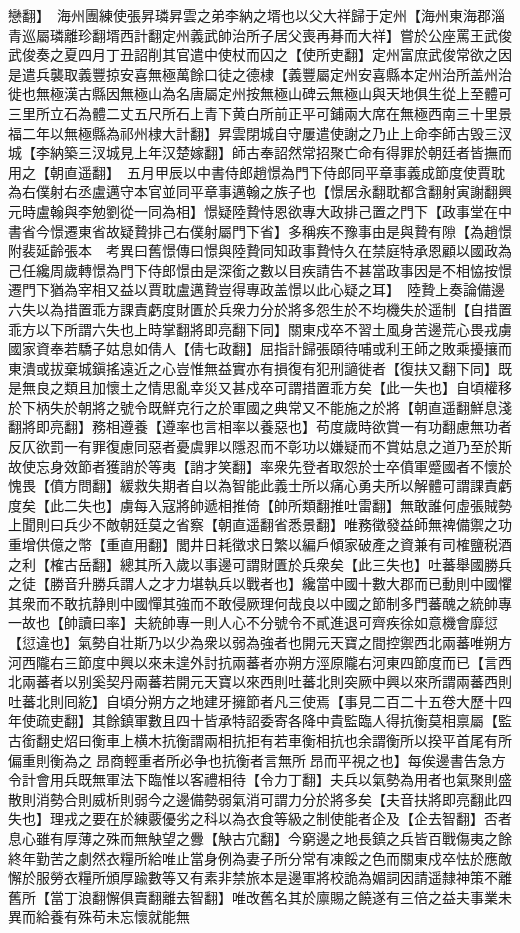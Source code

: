 戀翻】　海州團練使張昇璘昇雲之弟李納之壻也以父大祥歸于定州【海州東海郡淄青巡屬璘離珍翻壻西計翻定州義武帥治所子居父喪再朞而大祥】嘗於公座罵王武俊武俊奏之夏四月丁丑詔削其官遣中使杖而囚之【使所吏翻】定州富庶武俊常欲之因是遣兵襲取義豐掠安喜無極萬餘口徒之德棣【義豐屬定州安喜縣本定州治所盖州治徙也無極漢古縣因無極山為名唐屬定州按無極山碑云無極山與天地俱生從上至體可三里所立石為體二丈五尺所石上青下黄白所前正平可鋪兩大席在無極西南三十里景福二年以無極縣為祁州棣大計翻】昇雲閉城自守屢遣使謝之乃止上命李師古毁三汊城【李納築三汊城見上年汉楚嫁翻】師古奉詔然常招聚亡命有得罪於朝廷者皆撫而用之【朝直遥翻】　五月甲辰以中書侍郎趙憬為門下侍郎同平章事義成節度使賈耽為右僕射右丞盧邁守本官並同平章事邁翰之族子也【憬居永翻耽都含翻射寅謝翻興元時盧翰與李勉劉從一同為相】憬疑陸贄恃恩欲專大政排己置之門下【政事堂在中書省今憬遷東省故疑贄排己右僕射屬門下省】多稱疾不豫事由是與贄有隙【為趙憬附裴延齡張本　考異曰舊憬傳曰憬與陸贄同知政事贄恃久在禁庭特承恩顧以國政為己任纔周歲轉憬為門下侍郎憬由是深銜之數以目疾請告不甚當政事因是不相恊按憬遷門下猶為宰相又益以賈耽盧邁贄豈得專政盖憬以此心疑之耳】　陸贄上奏論備邊六失以為措置乖方課責虧度財匱於兵衆力分於將多怨生於不均機失於遥制【自措置乖方以下所謂六失也上時掌翻將即亮翻下同】關東戍卒不習土風身苦邊荒心畏戎虜國家資奉若驕子姑息如倩人【倩七政翻】屈指計歸張頤待哺或利王師之敗乘擾攘而東潰或拔棄城鎭搖遠近之心豈惟無益實亦有損復有犯刑讁徙者【復扶又翻下同】既是無良之類且加懷土之情思亂幸災又甚戍卒可謂措置乖方矣【此一失也】自頃權移於下柄失於朝將之號令既鮮克行之於軍國之典常又不能施之於將【朝直遥翻鮮息淺翻將即亮翻】務相遵養【遵率也言相率以養惡也】苟度歲時欲賞一有功翻慮無功者反仄欲罰一有罪復慮同惡者憂虞罪以隱忍而不彰功以嫌疑而不賞姑息之道乃至於斯故使忘身效節者獲誚於等夷【誚才笑翻】率衆先登者取怨於士卒僨軍蹙國者不懷於愧畏【僨方問翻】緩救失期者自以為智能此義士所以痛心勇夫所以解體可謂課責虧度矣【此二失也】虜每入寇將帥遞相推倚【帥所類翻推吐雷翻】無敢誰何虛張賊勢上聞則曰兵少不敵朝廷莫之省察【朝直遥翻省悉景翻】唯務徵發益師無禆備禦之功重增供億之幣【重直用翻】閭井日耗徵求日繁以編戶傾家破產之資兼有司榷鹽税酒之利【榷古岳翻】總其所入歲以事邊可謂財匱於兵衆矣【此三失也】吐蕃舉國勝兵之徒【勝音升勝兵謂人之才力堪執兵以戰者也】纔當中國十數大郡而已動則中國懼其衆而不敢抗静則中國憚其強而不敢侵厥理何哉良以中國之節制多門蕃醜之統帥專一故也【帥讀曰率】夫統帥專一則人心不分號令不貳進退可齊疾徐如意機會靡愆【愆違也】氣勢自壮斯乃以少為衆以弱為強者也開元天寶之間控禦西北兩蕃唯朔方河西隴右三節度中興以來未遑外討抗兩蕃者亦朔方涇原隴右河東四節度而已【言西北兩蕃者以别奚契丹兩蕃若開元天寶以來西則吐蕃北則突厥中興以來所謂兩蕃西則吐蕃北則囘紇】自頃分朔方之地建牙擁節者凡三使焉【事見二百二十五卷大歷十四年使疏吏翻】其餘鎮軍數且四十皆承特詔委寄各降中貴監臨人得抗衡莫相禀屬【監古銜翻史炤曰衡車上横木抗衡謂兩相抗拒有若車衡相抗也余謂衡所以揆平首尾有所偏重則衡為之昂商輕重者所必争也抗衡者言無所昂而平視之也】每俟邊書告急方令計會用兵既無軍法下臨惟以客禮相待【令力丁翻】夫兵以氣勢為用者也氣聚則盛散則消勢合則威析則弱今之邊備勢弱氣消可謂力分於將多矣【夫音扶將即亮翻此四失也】理戎之要在於練覈優劣之科以為衣食等級之制使能者企及【企去智翻】否者息心雖有厚薄之殊而無觖望之釁【觖古宂翻】今窮邊之地長鎮之兵皆百戰傷夷之餘終年勤苦之劇然衣糧所給唯止當身例為妻子所分常有凍餒之色而關東戍卒怯於應敵懈於服勞衣糧所頒厚踰數等又有素非禁旅本是邊軍將校詭為媚詞因請遥隸神策不離舊所【當丁浪翻懈俱賣翻離去智翻】唯改舊名其於廪賜之饒遂有三倍之益夫事業未異而給養有殊苟未忘懷就能無